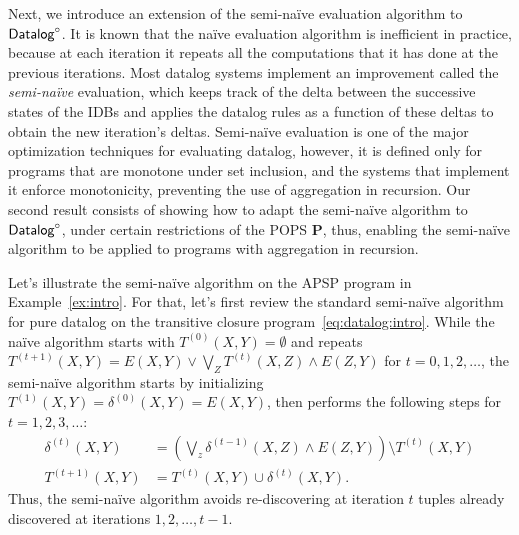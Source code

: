 Next, we introduce an extension of the semi-na\"ive evaluation
algorithm to $\text{\sf Datalog}^\circ$.  It is known that the na\"ive evaluation
algorithm is inefficient in practice, because at each iteration it
repeats all the computations that it has done at the previous
iterations.  Most datalog systems implement an improvement called the
{\em semi-na\"ive} evaluation, which keeps track of the delta between
the successive states of the IDBs and applies the datalog rules as a
function of these deltas to obtain the new iteration's deltas.
Semi-na\"ive evaluation is one of the major optimization techniques
for evaluating datalog, however, it is defined only for programs that
are monotone under set inclusion, and the systems that implement it
enforce monotonicity, preventing the use of aggregation in
recursion. Our second result consists of showing how to adapt the
semi-na\"ive algorithm to $\text{\sf Datalog}^\circ$, under certain restrictions of the
POPS $\bm P$, thus, enabling the semi-na\"ive algorithm to be applied
to programs with aggregation in recursion.

Let's illustrate the semi-na\"ive algorithm on the APSP program in
Example~\ref{ex:intro}.  For that, let's first review the standard
semi-na\"ive algorithm for pure datalog on the transitive closure
program~\eqref{eq:datalog:intro}.  While the na\"ive algorithm starts
with $T^{(0)}(X,Y)=\emptyset$ and repeats
$T^{(t+1)}(X,Y) = E(X,Y) \vee \bigvee_Z T^{(t)}(X,Z) \wedge E(Z,Y)$
for $t=0,1,2,\ldots$, the semi-na\"ive algorithm starts by
initializing $T^{(1)}(X,Y) = \delta^{(0)}(X,Y) = E(X,Y)$, then
performs the following steps for $t=1,2,3,\ldots$:
%
\begin{align}
  \delta^{(t)}(X,Y) &= \left(\bigvee_z \delta^{(t-1)}(X,Z) \wedge E(Z,Y) \right) \setminus T^{(t)}(X,Y) \label{eqn:deltat}\\
  T^{(t+1)}(X,Y) &= T^{(t)}(X,Y) \cup \delta^{(t)}(X,Y).\nonumber
\end{align}
%
Thus, the semi-na\"ive algorithm avoids re-discovering at iteration
$t$ tuples already discovered at iterations $1,2,\ldots, t-1$.


